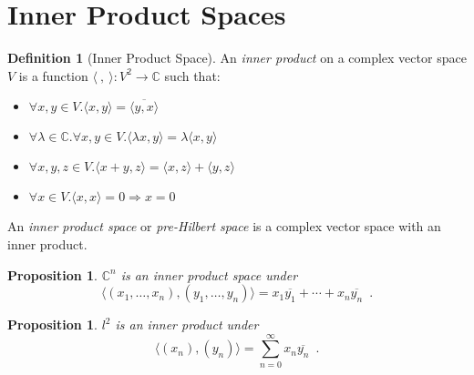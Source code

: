 \documentclass{book}
\newtheorem{prop}[ax]{Proposition}
\theoremstyle{definition}
\newtheorem{df}[ax]{Definition}
\begin{document}
\section{Inner Product Spaces}

\begin{df}[Inner Product Space]
An \emph{inner product} on a complex vector space $V$ is a function $\langle \ ,\ \rangle : V^2 \rightarrow \mathbb{C}$ such that:
\begin{itemize}
\item $\forall x,y \in V. \langle x,y \rangle = \overline{ \langle y,x \rangle}$
\item $\forall \lambda \in \mathbb{C}. \forall x,y \in V. \langle \lambda x,y \rangle = \lambda \langle x,y \rangle$
\item $\forall x,y,z \in V. \langle x + y, z \rangle = \langle x,z \rangle + \langle y,z \rangle$
\item $\forall x \in V. \langle x,x \rangle = 0 \Rightarrow x = 0$
\end{itemize}
An \emph{inner product space} or \emph{pre-Hilbert space} is a complex vector space with an inner product.
\end{df}

\begin{prop}
$\mathbb{C}^n$ is an inner product space under
\[ \langle (x_1, \ldots, x_n) , (y_1 ,\ldots, y_n) \rangle = x_1 \overline{y_1} + \cdots + x_n \overline{y_n} \enspace . \]
\end{prop}

\begin{prop}
$l^2$ is an inner product under
\[ \langle (x_n),(y_n) \rangle = \sum_{n=0}^\infty x_n \overline{y_n} \enspace . \]
\end{prop}
\end{document}
